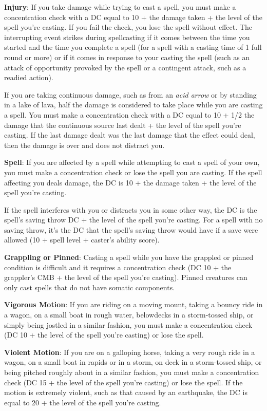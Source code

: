 \textbf{Injury}: If you take damage while trying to cast a spell, you must make a concentration check with a DC equal to 10 + the damage taken + the level of the spell you're casting. If you fail the check, you lose the spell without effect. The interrupting event strikes during spellcasting if it comes between the time you started and the time you complete a spell (for a spell with a casting time of 1 full round or more) or if it comes in response to your casting the spell (such as an attack of opportunity provoked by the spell or a contingent attack, such as a readied action).
				
If you are taking continuous damage, such as from an \textit{acid arrow} or by standing in a lake of lava, half the damage is considered to take place while you are casting a spell. You must make a concentration check with a DC equal to 10 + 1/2 the damage that the continuous source last dealt + the level of the spell you're casting. If the last damage dealt was the last damage that the effect could deal, then the damage is over and does not distract you.
				
\textbf{Spell}: If you are affected by a spell while attempting to cast a spell of your own, you must make a concentration check or lose the spell you are casting. If the spell affecting you deals damage, the DC is 10 + the damage taken + the level of the spell you're casting.
				
If the spell interferes with you or distracts you in some other way, the DC is the spell's saving throw DC + the level of the spell you're casting. For a spell with no saving throw, it's the DC that the spell's saving throw would have if a save were allowed (10 + spell level + caster's ability score).
				
\textbf{Grappling or Pinned}: Casting a spell while you have the grappled or pinned condition is difficult and it requires a concentration check (DC 10 + the grappler's CMB + the level of the spell you're casting). Pinned creatures can only cast spells that do not have somatic components.
				
\textbf{Vigorous Motion}: If you are riding on a moving mount, taking a bouncy ride in a wagon, on a small boat in rough water, belowdecks in a storm-tossed ship, or simply being jostled in a similar fashion, you must make a concentration check (DC 10 + the level of the spell you're casting) or lose the spell. 
				
\textbf{Violent Motion}: If you are on a galloping horse, taking a very rough ride in a wagon, on a small boat in rapids or in a storm, on deck in a storm-tossed ship, or being pitched roughly about in a similar fashion, you must make a concentration check (DC 15 + the level of the spell you're casting) or lose the spell. If the motion is extremely violent, such as that caused by an earthquake, the DC is equal to 20 + the level of the spell you're casting.
				

